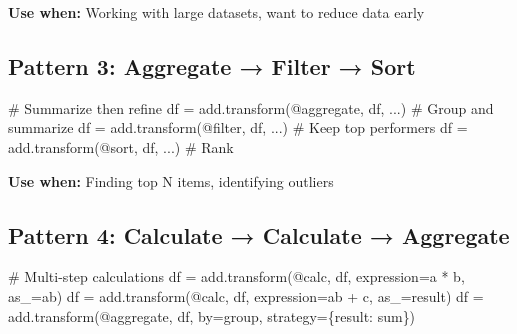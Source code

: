 \documentclass[
  letterpaper,
]{scrbook}
\newenvironment{Shaded}{\begin{snugshade}}{\end{snugshade}}
\newcommand{\CommentTok}[1]{\textcolor[rgb]{0.37,0.37,0.37}{#1}}
\newcommand{\NormalTok}[1]{\textcolor[rgb]{0.00,0.23,0.31}{#1}}
\newcommand{\OperatorTok}[1]{\textcolor[rgb]{0.37,0.37,0.37}{#1}}
\newcommand{\StringTok}[1]{\textcolor[rgb]{0.13,0.47,0.30}{#1}}
\begin{document}
\textbf{Use when:} Working with large datasets, want to reduce data
early

\subsection{Pattern 3: Aggregate → Filter →
Sort}\label{pattern-3-aggregate-filter-sort}

\begin{Shaded}
\begin{Highlighting}[]
\CommentTok{\# Summarize then refine}
\NormalTok{df }\OperatorTok{=}\NormalTok{ add.transform(}\StringTok{\textquotesingle{}@aggregate\textquotesingle{}}\NormalTok{, df, ...) }\CommentTok{\# Group and summarize}
\NormalTok{df }\OperatorTok{=}\NormalTok{ add.transform(}\StringTok{\textquotesingle{}@filter\textquotesingle{}}\NormalTok{, df, ...)    }\CommentTok{\# Keep top performers}
\NormalTok{df }\OperatorTok{=}\NormalTok{ add.transform(}\StringTok{\textquotesingle{}@sort\textquotesingle{}}\NormalTok{, df, ...)      }\CommentTok{\# Rank}
\end{Highlighting}
\end{Shaded}

\textbf{Use when:} Finding top N items, identifying outliers

\subsection{Pattern 4: Calculate → Calculate →
Aggregate}\label{pattern-4-calculate-calculate-aggregate}

\begin{Shaded}
\begin{Highlighting}[]
\CommentTok{\# Multi{-}step calculations}
\NormalTok{df }\OperatorTok{=}\NormalTok{ add.transform(}\StringTok{\textquotesingle{}@calc\textquotesingle{}}\NormalTok{, df, expression}\OperatorTok{=}\StringTok{\textquotesingle{}a * b\textquotesingle{}}\NormalTok{, as\_}\OperatorTok{=}\StringTok{\textquotesingle{}ab\textquotesingle{}}\NormalTok{)}
\NormalTok{df }\OperatorTok{=}\NormalTok{ add.transform(}\StringTok{\textquotesingle{}@calc\textquotesingle{}}\NormalTok{, df, expression}\OperatorTok{=}\StringTok{\textquotesingle{}ab + c\textquotesingle{}}\NormalTok{, as\_}\OperatorTok{=}\StringTok{\textquotesingle{}result\textquotesingle{}}\NormalTok{)}
\NormalTok{df }\OperatorTok{=}\NormalTok{ add.transform(}\StringTok{\textquotesingle{}@aggregate\textquotesingle{}}\NormalTok{, df, by}\OperatorTok{=}\StringTok{\textquotesingle{}group\textquotesingle{}}\NormalTok{, strategy}\OperatorTok{=}\NormalTok{\{}\StringTok{\textquotesingle{}result\textquotesingle{}}\NormalTok{: }\StringTok{\textquotesingle{}sum\textquotesingle{}}\NormalTok{\})}
\end{Highlighting}
\end{Shaded}
\end{document}
